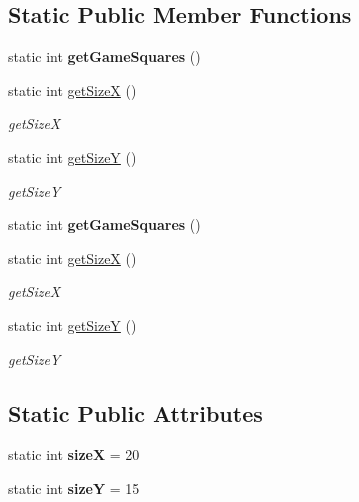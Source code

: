 \subsection*{Static Public Member Functions}
\begin{DoxyCompactItemize}
\item 
\hypertarget{class_gameboard_aa10ed162ff321f4fe480e531ef352bd8}{}static int {\bfseries get\+Game\+Squares} ()\label{class_gameboard_aa10ed162ff321f4fe480e531ef352bd8}

\item 
static int \hyperlink{class_gameboard_ab64b2e36f45a6d19b85df77bec6511e3}{get\+Size\+X} ()
\begin{DoxyCompactList}\small\item\em get\+Size\+X \end{DoxyCompactList}\item 
static int \hyperlink{class_gameboard_a4c24be994533597a965ada18a4b70a35}{get\+Size\+Y} ()
\begin{DoxyCompactList}\small\item\em get\+Size\+Y \end{DoxyCompactList}\item 
\hypertarget{class_gameboard_abbb7bbb191ceb2a8f9ff8127c137e6db}{}static int {\bfseries get\+Game\+Squares} ()\label{class_gameboard_abbb7bbb191ceb2a8f9ff8127c137e6db}

\item 
static int \hyperlink{class_gameboard_a7608e79bfe05ad0742fbf81277045029}{get\+Size\+X} ()
\begin{DoxyCompactList}\small\item\em get\+Size\+X \end{DoxyCompactList}\item 
static int \hyperlink{class_gameboard_ae35c2c74c7ff6d54a568212e217b42c7}{get\+Size\+Y} ()
\begin{DoxyCompactList}\small\item\em get\+Size\+Y \end{DoxyCompactList}\end{DoxyCompactItemize}
\subsection*{Static Public Attributes}
\begin{DoxyCompactItemize}
\item 
\hypertarget{class_gameboard_ac369f7be1f2d6213446001327dfe2b46}{}static int {\bfseries size\+X} = 20\label{class_gameboard_ac369f7be1f2d6213446001327dfe2b46}

\item 
\hypertarget{class_gameboard_a9bd9fa4c73c4703bc38394a220575bd3}{}static int {\bfseries size\+Y} = 15\label{class_gameboard_a9bd9fa4c73c4703bc38394a220575bd3}

\end{DoxyCompactItemize}


